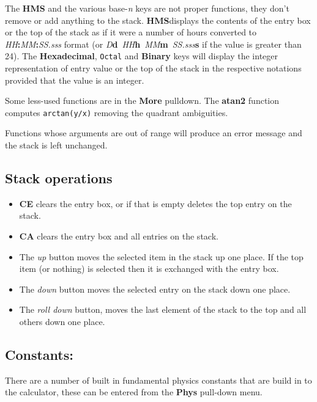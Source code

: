 \documentclass{article}
\begin{document}
  The \textbf{HMS} and the various base-\emph{n} keys are not proper
  functions, they don't remove or add anything to the stack.
  \textbf{HMS}displays the contents of the entry box or the top of the
  stack as if it were a number of hours converted to
  \emph{HH}\textbf{:}\emph{MM}\textbf{:}\emph{SS.sss} format (or
  \emph{D}\textbf{d}~\emph{HH}\textbf{h}~\emph{MM}\textbf{m}~\emph{SS.sss}\textbf{s}
  if the value is greater than 24). The \textbf{Hexadecimal},
  \texttt{Octal} and \textbf{Binary} keys will display the integer
  representation of entry value or the top of the stack in the
  respective notations provided that the value is an integer.

  Some less-used functions are in the \textbf{More} pulldown. The
  \textbf{atan2} function computes \texttt{arctan(y/x)} removing the
  quadrant ambiguities.

  Functions whose arguments are out of range will produce an error
  message and the stack is left unchanged.

  \subsection{Stack operations}

  \begin{itemize}
  \item \textbf{CE} clears the entry box, or if that is empty deletes
    the top entry on the stack.

  \item \textbf{CA} clears the entry box and all entries on the stack.

  \item The \emph{up} button moves the selected item in the stack up
    one place. If the top item (or nothing) is selected then it is
    exchanged with the entry box.

  \item The \emph{down} button moves the selected entry on the stack
    down one place.

  \item The \emph{roll down} button, moves the last element of the
    stack to the top and all others down one place.
  \end{itemize}

  \subsection{Constants:}

  There are a number of built in fundamental physics constants that are
  build in to the calculator, these can be entered from the
  \textbf{Phys} pull-down menu.
\end{document}
